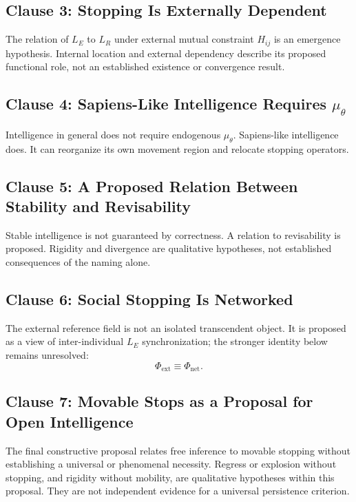 \subsection{Clause 3: Stopping Is Externally Dependent}

The relation of $L_E$ to $L_R$ under external mutual constraint $H_{ij}$ is an emergence hypothesis. Internal location and external dependency describe its proposed functional role, not an established existence or convergence result.

\subsection{Clause 4: Sapiens-Like Intelligence Requires $\mu_\theta$}

Intelligence in general does not require endogenous $\mu_\theta$. Sapiens-like intelligence does. It can reorganize its own movement region and relocate stopping operators.

\subsection{Clause 5: A Proposed Relation Between Stability and Revisability}

Stable intelligence is not guaranteed by correctness. A relation to revisability is proposed. Rigidity and divergence are qualitative hypotheses, not established consequences of the naming alone.

\subsection{Clause 6: Social Stopping Is Networked}

The external reference field is not an isolated transcendent object. It is proposed as a view of inter-individual $L_E$ synchronization; the stronger identity below remains unresolved:
\[
\Phi_{\text{ext}}\equiv\Phi_{\text{net}}.
\]

\subsection{Clause 7: Movable Stops as a Proposal for Open Intelligence}

The final constructive proposal relates free inference to movable stopping without establishing a universal or phenomenal necessity. Regress or explosion without stopping, and rigidity without mobility, are qualitative hypotheses within this proposal. They are not independent evidence for a universal persistence criterion.

\bigskip
